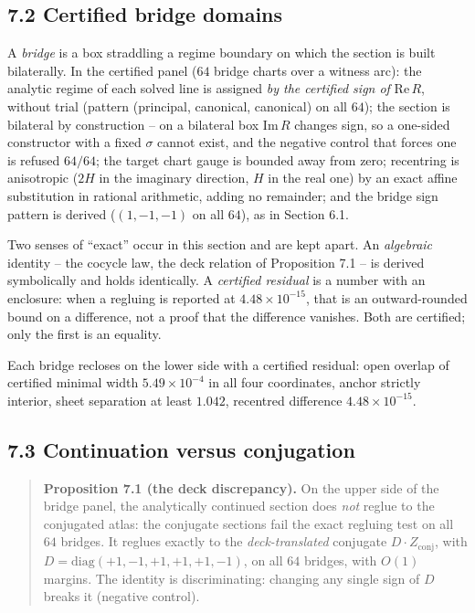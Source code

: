 \subsection{7.2 Certified bridge domains}\label{certified-bridge-domains}

A \emph{bridge} is a box straddling a regime boundary on which the section is built bilaterally. In the certified panel (\(64\) bridge charts over a witness arc): the analytic regime of each solved line is assigned \emph{by the certified sign of} \(\mathrm{Re}\, R\), without trial (pattern (principal, canonical, canonical) on all \(64\)); the section is bilateral by construction -- on a bilateral box \(\mathrm{Im}\, R\) changes sign, so a one-sided constructor with a fixed \(\sigma\) cannot exist, and the negative control that forces one is refused \(64/64\); the target chart gauge is bounded away from zero; recentring is anisotropic (\(2H\) in the imaginary direction, \(H\) in the real one) by an exact affine substitution in rational arithmetic, adding no remainder; and the bridge sign pattern is derived (\((1,-1,-1)\) on all \(64\)), as in Section 6.1.

Two senses of ``exact'' occur in this section and are kept apart. An \emph{algebraic} identity -- the cocycle law, the deck relation of Proposition 7.1 -- is derived symbolically and holds identically. A \emph{certified residual} is a number with an enclosure: when a regluing is reported at \(4.48 \times 10^{-15}\), that is an outward-rounded bound on a difference, not a proof that the difference vanishes. Both are certified; only the first is an equality.

Each bridge recloses on the lower side with a certified residual: open overlap of certified minimal width \(5.49 \times 10^{-4}\) in all four coordinates, anchor strictly interior, sheet separation at least \(1.042\), recentred difference \(4.48 \times 10^{-15}\).

\subsection{7.3 Continuation versus conjugation}\label{continuation-versus-conjugation}

\begin{quote}
\textbf{Proposition 7.1 (the deck discrepancy).} On the upper side of the bridge panel, the analytically continued section does \emph{not} reglue to the conjugated atlas: the conjugate sections fail the exact regluing test on all \(64\) bridges. It reglues exactly to the \emph{deck-translated} conjugate \(D \cdot Z_{\mathrm{conj}}\), with \(D = \mathrm{diag}(+1, -1, +1, +1, +1, -1)\), on all \(64\) bridges, with \(O(1)\) margins. The identity is discriminating: changing any single sign of \(D\) breaks it (negative control).
\end{quote}

